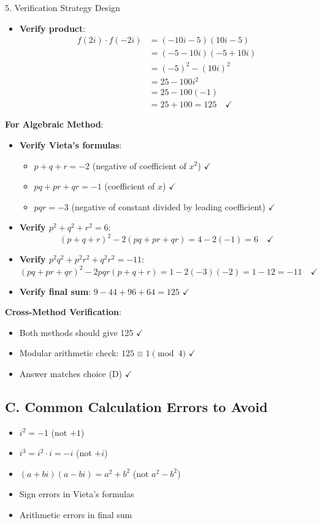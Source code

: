 \documentclass[12pt]{article}
\begin{document}
\begin{verificationbox}{5. Verification Strategy Design}
\begin{itemize}
    \item \textbf{Verify product}:
    \begin{align*}
    f(2i) \cdot f(-2i) &= (-10i - 5)(10i - 5)\\
    &= (-5 - 10i)(-5 + 10i)\\
    &= (-5)^2 - (10i)^2\\
    &= 25 - 100i^2\\
    &= 25 - 100(-1)\\
    &= 25 + 100 = 125 \quad \checkmark
    \end{align*}
\end{itemize}

\textbf{For Algebraic Method}:
\begin{itemize}
    \item \textbf{Verify Vieta's formulas}:
    \begin{itemize}
        \item $p + q + r = -2$ (negative of coefficient of $x^2$) $\checkmark$
        \item $pq + pr + qr = -1$ (coefficient of $x$) $\checkmark$
        \item $pqr = -3$ (negative of constant divided by leading coefficient) $\checkmark$
    \end{itemize}
    
    \item \textbf{Verify $p^2 + q^2 + r^2 = 6$}:
    \[(p + q + r)^2 - 2(pq + pr + qr) = 4 - 2(-1) = 6 \quad \checkmark\]
    
    \item \textbf{Verify $p^2q^2 + p^2r^2 + q^2r^2 = -11$}:
    \[(pq + pr + qr)^2 - 2pqr(p + q + r) = 1 - 2(-3)(-2) = 1 - 12 = -11 \quad \checkmark\]
    
    \item \textbf{Verify final sum}: $9 - 44 + 96 + 64 = 125$ $\checkmark$
\end{itemize}

\textbf{Cross-Method Verification}:
\begin{itemize}
    \item Both methods should give 125 $\checkmark$
    \item Modular arithmetic check: $125 \equiv 1 \pmod{4}$ $\checkmark$
    \item Answer matches choice (D) $\checkmark$
\end{itemize}

\subsection*{C. Common Calculation Errors to Avoid}
\begin{itemize}[leftmargin=*]
    \item $i^2 = -1$ (not $+1$)
    \item $i^3 = i^2 \cdot i = -i$ (not $+i$)
    \item $(a + bi)(a - bi) = a^2 + b^2$ (not $a^2 - b^2$)
    \item Sign errors in Vieta's formulas
    \item Arithmetic errors in final sum
\end{itemize}


\end{verificationbox}
\end{document}
